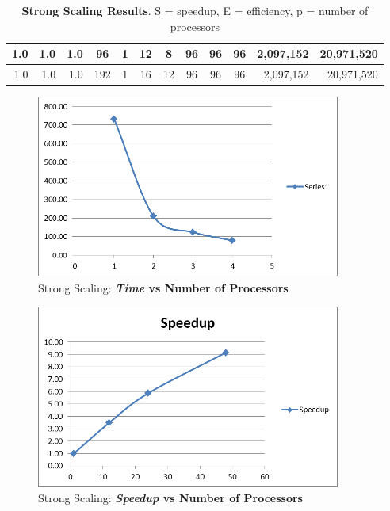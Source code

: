\documentclass[]{article}
\begin{document}
\begin{table}[h!]
\begin{tabular}{|r|r|r|c|c|c|c|c|c|c|r|r|}
1.0                                                  & 1.0                                              & 1.0                                              & 96                          & 1           & 12          & 8           & 96           & 96           & 96          & 2,097,152                                                & 20,971,520                                                   \\ \hline
1.0                                                  & 1.0                                              & 1.0                                              & 192                         & 1           & 16          & 12          & 96           & 96           & 96          & 2,097,152                                                & 20,971,520                                                   \\ \hline
\end{tabular}
\caption{\textbf{Strong Scaling Results}. S = speedup, E = efficiency, p = number of processors}
\end{table}


\begin{figure}[h!]
    \centering
    \includegraphics[width=10cm]{strong_times.png}
    \caption{Strong Scaling: \textbf{\textit{Time} vs Number of Processors}}
\end{figure}

\begin{figure}[h!]
    \centering
    \includegraphics[width=10cm]{strong_speedup.png}
    \caption{Strong Scaling: \textbf{\textit{Speedup} vs Number of Processors}}
\end{figure}
\end{document}
